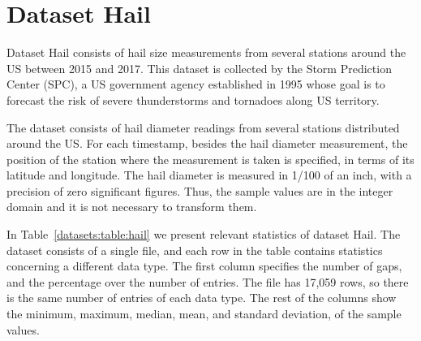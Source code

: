 
\vspace{-15pt}
\section{Dataset Hail}
\label{datasets:hail}

Dataset Hail \cite{dataset:spc} consists of hail size measurements from several stations around the US between 2015 and 2017. This dataset is collected by the Storm Prediction Center (SPC), a US government agency established in 1995 whose goal is to forecast the risk of severe thunderstorms and tornadoes along US territory.


The dataset consists of hail diameter readings from several stations distributed around the US. For each timestamp, besides the hail diameter measurement, the position of the station where the measurement is taken is specified, in terms of its latitude and longitude. The hail diameter is measured in 1/100 of an inch, with a precision of zero significant figures. Thus, the sample values are in the integer domain and it is not necessary to transform them.


In Table~\ref{datasets:table:hail} we present relevant statistics of dataset Hail. The dataset consists of a single file, and each row in the table contains statistics concerning a different data type. The first column specifies the number of gaps, and the percentage over the number of entries. The file has 17,059 rows, so there is the same number of entries of each data type. The rest of the columns show the minimum, maximum, median, mean, and standard deviation, of the sample values.




